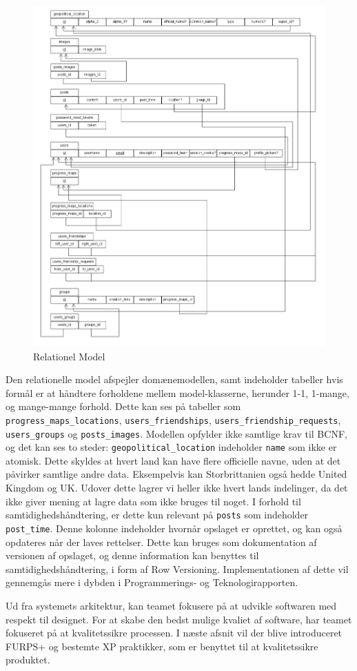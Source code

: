 \begin{figure}
    \includegraphics[width=\linewidth]{figures/RelationelmModel.png}
    \caption{Relationel Model}
    \label{fif:Rela}
\end{figure}

Den relationelle model afspejler domænemodellen, samt indeholder tabeller hvis formål er at håndtere forholdene mellem model-klasserne, herunder 1-1, 1-mange, og mange-mange forhold. Dette kan ses på tabeller som \texttt{progress\_maps\_locations}, \texttt{users\_friendships}, \texttt{users\_friendship\_requests}, \texttt{users\_groups} og \texttt{posts\_images}. Modellen opfylder ikke samtlige krav til BCNF\cite{bcnf}, og det kan ses to steder: \texttt{geopolitical\_location} indeholder \texttt{name} som ikke er atomisk. Dette skyldes at hvert land kan have flere officielle navne, uden at det påvirker samtlige andre data. Eksempelvis kan Storbrittanien også hedde United Kingdom og UK. Udover dette lagrer vi heller ikke hvert lands indelinger, da det ikke giver mening at lagre data som ikke bruges til noget. 
I forhold til samtidighedshåndtering, er dette kun relevant på \texttt{posts} som indeholder \texttt{post\_time}. Denne kolonne indeholder hvornår opslaget er oprettet, og kan også opdateres når der laves rettelser. Dette kan bruges som dokumentation af versionen af opslaget, og denne information kan benyttes til samtidighedshåndtering, i form af Row Versioning\cite{rowVersion}. Implementationen af dette vil gennemgås mere i dybden i Programmerings- og Teknologirapporten.

Ud fra systemets arkitektur, kan teamet fokusere på at udvikle softwaren med respekt til designet. For at skabe den bedst mulige kvaliet af software, har teamet fokuseret på at kvalitetssikre processen. I næste afsnit vil der blive introduceret FURPS+ og bestemte XP praktikker, som er benyttet til at kvalitetssikre produktet.  